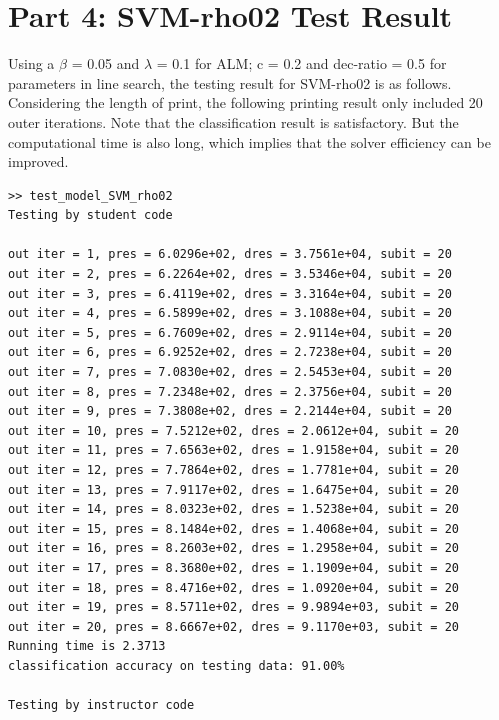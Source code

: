 \documentclass[12pt]{article}
\begin{document}
\section*{Part 4: SVM-rho02 Test Result}
$$
$$
Using a \(\beta\) = 0.05 and \(\lambda\) = 0.1 for ALM; c = 0.2 and dec-ratio = 0.5 for parameters in line search, the testing result for SVM-rho02 is as follows. Considering the length of print, the following printing result only included 20 outer iterations. Note that the classification result is satisfactory. But the computational time is also long, which implies that the solver efficiency can be improved.
\begin{verbatim}
>> test_model_SVM_rho02
Testing by student code

out iter = 1, pres = 6.0296e+02, dres = 3.7561e+04, subit = 20
out iter = 2, pres = 6.2264e+02, dres = 3.5346e+04, subit = 20
out iter = 3, pres = 6.4119e+02, dres = 3.3164e+04, subit = 20
out iter = 4, pres = 6.5899e+02, dres = 3.1088e+04, subit = 20
out iter = 5, pres = 6.7609e+02, dres = 2.9114e+04, subit = 20
out iter = 6, pres = 6.9252e+02, dres = 2.7238e+04, subit = 20
out iter = 7, pres = 7.0830e+02, dres = 2.5453e+04, subit = 20
out iter = 8, pres = 7.2348e+02, dres = 2.3756e+04, subit = 20
out iter = 9, pres = 7.3808e+02, dres = 2.2144e+04, subit = 20
out iter = 10, pres = 7.5212e+02, dres = 2.0612e+04, subit = 20
out iter = 11, pres = 7.6563e+02, dres = 1.9158e+04, subit = 20
out iter = 12, pres = 7.7864e+02, dres = 1.7781e+04, subit = 20
out iter = 13, pres = 7.9117e+02, dres = 1.6475e+04, subit = 20
out iter = 14, pres = 8.0323e+02, dres = 1.5238e+04, subit = 20
out iter = 15, pres = 8.1484e+02, dres = 1.4068e+04, subit = 20
out iter = 16, pres = 8.2603e+02, dres = 1.2958e+04, subit = 20
out iter = 17, pres = 8.3680e+02, dres = 1.1909e+04, subit = 20
out iter = 18, pres = 8.4716e+02, dres = 1.0920e+04, subit = 20
out iter = 19, pres = 8.5711e+02, dres = 9.9894e+03, subit = 20
out iter = 20, pres = 8.6667e+02, dres = 9.1170e+03, subit = 20
Running time is 2.3713
classification accuracy on testing data: 91.00%

Testing by instructor code


\end{verbatim}
\end{document}
